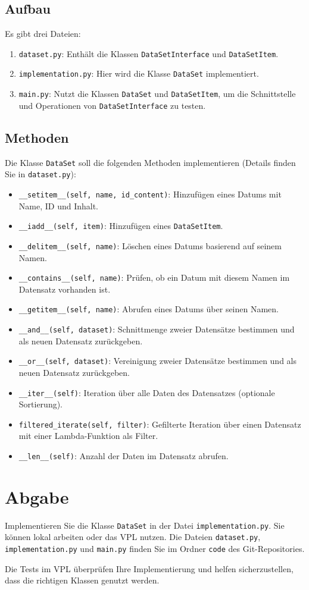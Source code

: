\documentclass[a4paper,12pt]{article}
\begin{document}
\subsection{Aufbau}
Es gibt drei Dateien:
\begin{enumerate}
    \item \texttt{dataset.py}: Enthält die Klassen \texttt{DataSetInterface} und \texttt{DataSetItem}.
    \item \texttt{implementation.py}: Hier wird die Klasse \texttt{DataSet} implementiert.
    \item \texttt{main.py}: Nutzt die Klassen \texttt{DataSet} und \texttt{DataSetItem}, um die Schnittstelle und Operationen von \texttt{DataSetInterface} zu testen.
\end{enumerate}

\subsection{Methoden}
Die Klasse \texttt{DataSet} soll die folgenden Methoden implementieren (Details finden Sie in \texttt{dataset.py}):
\begin{itemize}
    \item \texttt{\_\_setitem\_\_(self, name, id\_content)}: Hinzufügen eines Datums mit Name, ID und Inhalt.
    \item \texttt{\_\_iadd\_\_(self, item)}: Hinzufügen eines \texttt{DataSetItem}.
    \item \texttt{\_\_delitem\_\_(self, name)}: Löschen eines Datums basierend auf seinem Namen.
    \item \texttt{\_\_contains\_\_(self, name)}: Prüfen, ob ein Datum mit diesem Namen im Datensatz vorhanden ist.
    \item \texttt{\_\_getitem\_\_(self, name)}: Abrufen eines Datums über seinen Namen.
    \item \texttt{\_\_and\_\_(self, dataset)}: Schnittmenge zweier Datensätze bestimmen und als neuen Datensatz zurückgeben.
    \item \texttt{\_\_or\_\_(self, dataset)}: Vereinigung zweier Datensätze bestimmen und als neuen Datensatz zurückgeben.
    \item \texttt{\_\_iter\_\_(self)}: Iteration über alle Daten des Datensatzes (optionale Sortierung).
    \item \texttt{filtered\_iterate(self, filter)}: Gefilterte Iteration über einen Datensatz mit einer Lambda-Funktion als Filter.
    \item \texttt{\_\_len\_\_(self)}: Anzahl der Daten im Datensatz abrufen.
\end{itemize}

\section{Abgabe}
Implementieren Sie die Klasse \texttt{DataSet} in der Datei \texttt{implementation.py}. Sie können lokal arbeiten oder das VPL nutzen. Die Dateien \texttt{dataset.py}, \texttt{implementation.py} und \texttt{main.py} finden Sie im Ordner \texttt{code} des Git-Repositories.

Die Tests im VPL überprüfen Ihre Implementierung und helfen sicherzustellen, dass die richtigen Klassen genutzt werden.
\end{document}
